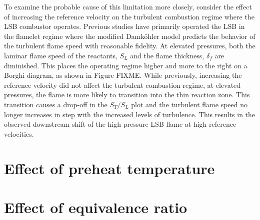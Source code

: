 To examine the probable cause of this limitation more closely, consider the effect of increasing the reference velocity on the turbulent combustion regime where the LSB combustor operates.
Previous studies have primarily operated the LSB in the flamelet regime where the modified Damk\"ohler model predicts the behavior of the turbulent flame speed with reasonable fidelity.
At elevated pressures, both the laminar flame speed of the reactants, \(S_L\) and the flame thickness, \(\delta_f\) are diminished.
This places the operating regime higher and more to the right on a Borghi diagram, as shown in Figure FIXME.
While previously, increasing the reference velocity did not affect the turbulent combustion regime, at elevated pressures, the flame is more likely to transition into the thin reaction zone.
This transition causes a drop-off in the \(S_T/S_L\) plot and the turbulent flame speed no longer increases in step with the increased levels of turbulence.
This results in the observed downstream shift of the high pressure LSB flame at high reference velocities.

\section{Effect of preheat temperature}

\section{Effect of equivalence ratio}

